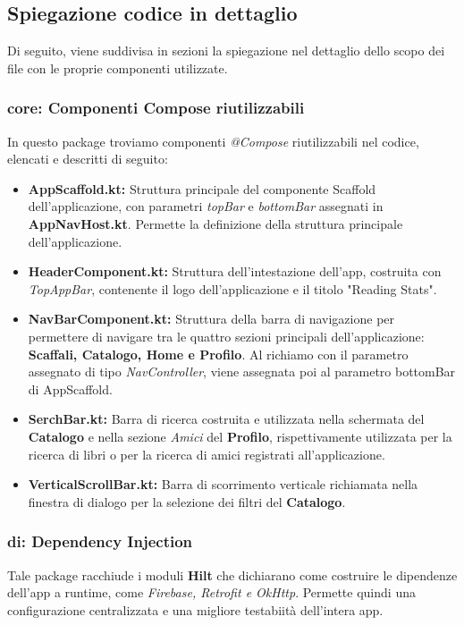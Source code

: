\documentclass{article}
\begin{document}
\subsection{Spiegazione codice in dettaglio}
Di seguito, viene suddivisa in sezioni la spiegazione nel dettaglio dello scopo dei file con le proprie componenti utilizzate.

\subsubsection{core: Componenti Compose riutilizzabili}
In questo package troviamo componenti \textit{@Compose} riutilizzabili nel codice, elencati e descritti di seguito:

\begin{itemize}
  \item \textbf{AppScaffold.kt:} Struttura principale del componente Scaffold dell'applicazione, con parametri \textit{topBar} e \textit{bottomBar} assegnati in \textbf{AppNavHost.kt}. Permette la definizione della struttura principale dell'applicazione.
  \item \textbf{HeaderComponent.kt:} Struttura dell'intestazione dell'app, costruita con \textit{TopAppBar}, contenente il logo dell'applicazione e il titolo "Reading Stats".
  \item \textbf{NavBarComponent.kt:} Struttura della barra di navigazione per permettere di navigare tra le quattro sezioni principali dell'applicazione: \textbf{Scaffali, Catalogo, Home e Profilo}. Al richiamo con il parametro assegnato di tipo \textit{NavController}, viene assegnata poi al parametro bottomBar di AppScaffold. 
  \item \textbf{SerchBar.kt:} Barra di ricerca costruita e utilizzata nella schermata del \textbf{Catalogo} e nella sezione \textit{Amici} del \textbf{Profilo}, rispettivamente utilizzata per la ricerca di libri o per la ricerca di amici registrati all'applicazione.
  \item \textbf{VerticalScrollBar.kt:} Barra di scorrimento verticale richiamata nella finestra di dialogo per la selezione dei filtri del \textbf{Catalogo}.
\end{itemize}

\subsubsection{di: Dependency Injection}
Tale package racchiude i moduli \textbf{Hilt} che dichiarano come costruire le dipendenze dell'app a runtime, come \textit{Firebase, Retrofit e OkHttp}. Permette quindi una configurazione centralizzata e una migliore testabiità dell'intera app.
\end{document}
